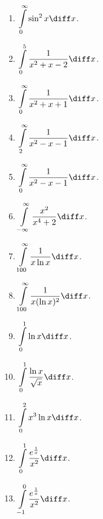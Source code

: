 \begin{multicols}{2}
\begin{enumerate}[ref={\fcProblemRef}]
\item $\displaystyle \int\limits_{0}^{\infty}\sin^2 x \diff x$.

\item $\displaystyle \int\limits_{0}^{5}\frac{1}{x^2+x-2} \diff x$.

\item $\displaystyle \int\limits_{0}^{\infty}\frac{1}{x^2+x+1} \diff x$.

\item $\displaystyle \int\limits_{2}^{\infty}\frac{1}{x^2-x-1} \diff x$.

\item $\displaystyle \int\limits_{0}^{\infty}\frac{1}{x^2-x-1} \diff x$.

\item \label{problemConvergencex^2/(x^4+2)from-inftyto+infty}

$\displaystyle \int\limits_{-\infty}^{\infty} \frac{x^2}{x^4+2} \diff x$.
\item $\displaystyle \int\limits_{100}^{\infty} \frac{1}{x\ln x} \diff x$.

\item $\displaystyle \int\limits_{100}^{\infty} \frac{1}{x(\ln x)^2} \diff x$.

\item $\displaystyle \int\limits_{0}^{1}\ln x \diff x$.

\item $\displaystyle \int\limits_{0}^{1}\frac{\ln x}{\sqrt{x}} \diff x$.

\item $\displaystyle \int\limits_{0}^{2}x^3\ln x \diff x$.

\item $\displaystyle \int\limits_{0}^{1} \frac{e^{\frac{1}{x}}}{x^2} \diff x$.

\item $\displaystyle \int\limits_{-1}^{0} \frac{e^{\frac{1}{x}}}{x^2} \diff x$.


\end{enumerate}
\end{multicols}
